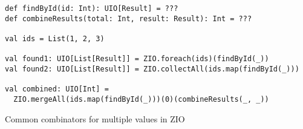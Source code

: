 \begin{algorithm}

\begin{verbatim}
def findById(id: Int): UIO[Result] = ???
def combineResults(total: Int, result: Result): Int = ???

val ids = List(1, 2, 3)

val found1: UIO[List[Result]] = ZIO.foreach(ids)(findById(_))
val found2: UIO[List[Result]] = ZIO.collectAll(ids.map(findById(_)))

val combined: UIO[Int] =
  ZIO.mergeAll(ids.map(findById(_)))(0)(combineResults(_, _))
\end{verbatim}

\caption{Common combinators for multiple values in ZIO \label{zio:multi-combinators}}
\end{algorithm}